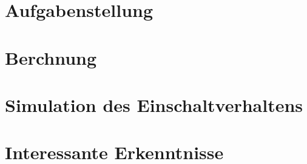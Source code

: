 \documentclass[11pt,a4paper,fleqn]{scrartcl}
\begin{document}
\Titelseite
\ifindex\else\tableofcontents\newpage\fi

\section{Aufgabenstellung}



\section{Berchnung}

\section{Simulation des Einschaltverhaltens}

\section{Interessante Erkenntnisse}
\end{document}
